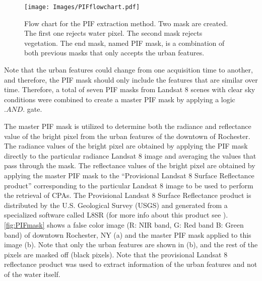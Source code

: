 \documentclass[onecolumn,3p,letterpaper,11pt]{elsarticle}
\begin{document}

\begin{figure}[htb]
  \centering


\texttt{[image: Images/PIFflowchart.pdf]}

\caption{Flow chart for the PIF extraction method. Two mask are created. The first one rejects water pixel. The second mask rejects vegetation. The end mask, named PIF mask, is a combination of both previous masks that only accepts the urban features. \label{fig:PIFflowchart}}
\end{figure}

Note that the urban features could change from one acquisition time to another, and therefore, the PIF mask should only include the features that are similar over time. Therefore, a total of seven PIF masks from Landsat 8 scenes with clear sky conditions were combined to create a master PIF mask by applying a logic $.AND.$ gate.

The master PIF mask is utilized to determine both the radiance and reflectance value of the bright pixel from the urban features of the downtown of Rochester. The radiance values of the bright pixel are obtained by applying the PIF mask directly to the particular radiance Landsat 8 image and averaging the values that pass through the mask. The reflectance values of the bright pixel are obtained by applying the master PIF mask to the ``Provisional Landsat 8 Surface Reflectance product'' corresponding to the particular Landsat 8 image to be used to perform the retrieval of CPAs. The Provisional Landsat 8 Surface Reflectance product is distributed by the U.S. Geological Survey (USGS) and generated from a specialized software called L8SR (for more info about this product see \citet{L8SurfProduct2015}). \autoref{fig:PIFmask} shows a false color image (R: NIR  band, G: Red band B: Green band) of downtown Rochester, NY (a) and the master PIF mask applied to this image (b). Note that only the urban features are shown in (b), and the rest of the pixels are masked off (black pixels). Note that the provisional Landsat 8 reflectance product was used to extract information of the urban features and not of the water itself.
\end{document}
